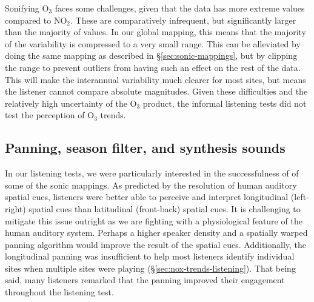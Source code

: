 \documentclass[a4paper,10pt,oneside]{article}
\newcommand{\ce}[1]{$\mathrm{#1}$}
\begin{document}
\begin{sloppy}
Sonifying \ce{O_3} faces some challenges, given that the data has more extreme values compared to \ce{NO_2}. These are comparatively infrequent, but significantly larger than the majority of values.  In our global mapping, this means that the majority of the variability is compressed to a very small range. This can be alleviated by doing the same mapping as described in \S\ref{sec:sonic-mappings}, but by clipping the range to prevent outliers from having such an effect on the rest of the data.  This will make the interannual variability much clearer for most sites, but means the listener cannot compare absolute magnitudes. Given these difficulties and the relatively high uncertainty of the \ce{O_3} product, the informal listening tests did not test the perception of \ce{O_3} trends.

\subsection{Panning, season filter, and synthesis sounds}
In our listening tests, we were particularly interested in the successfulness of of some of the sonic mappings. As predicted by the resolution of human auditory spatial cues, listeners were better able to perceive and interpret longitudinal (left-right) spatial cues than latitudinal (front-back) spatial cues. It is challenging to mitigate this issue outright as we are fighting with a physiological feature of the human auditory system. Perhaps a higher speaker density and a spatially warped panning algorithm would improve the result of the spatial cues. Additionally, the longitudinal panning was insufficient to help most listeners identify individual sites when multiple sites were playing (\S\ref{sec:nox-trends-listening}).  That being said, many listeners remarked that the panning improved their engagement throughout the listening test.  


\end{sloppy}
\end{document}
